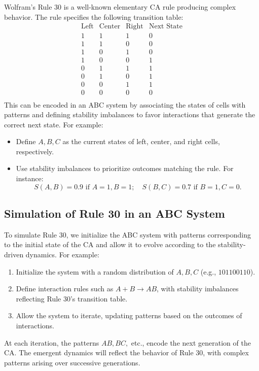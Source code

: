 \documentclass[entropy,article,submit,pdftex,moreauthors]{Definitions/mdpi}
\begin{document}
Wolfram’s Rule 30 is a well-known elementary CA rule producing complex behavior. The rule specifies the following transition table:
\[
\begin{array}{ccc|c}
\text{Left} & \text{Center} & \text{Right} & \text{Next State} \\
1 & 1 & 1 & 0 \\
1 & 1 & 0 & 0 \\
1 & 0 & 1 & 0 \\
1 & 0 & 0 & 1 \\
0 & 1 & 1 & 1 \\
0 & 1 & 0 & 1 \\
0 & 0 & 1 & 1 \\
0 & 0 & 0 & 0 \\
\end{array}
\]
This can be encoded in an ABC system by associating the states of cells with patterns and defining stability imbalances to favor interactions that generate the correct next state. For example:
\begin{itemize}
    \item Define \( A, B, C \) as the current states of left, center, and right cells, respectively.
    \item Use stability imbalances to prioritize outcomes matching the rule. For instance:
    \[
    S(A, B) = 0.9 \text{ if } A = 1, B = 1; \quad S(B, C) = 0.7 \text{ if } B = 1, C = 0.
    \]
\end{itemize}

\subsection{Simulation of Rule 30 in an ABC System}

To simulate Rule 30, we initialize the ABC system with patterns corresponding to the initial state of the CA and allow it to evolve according to the stability-driven dynamics. For example:
\begin{enumerate}
    \item Initialize the system with a random distribution of \( A, B, C \) (e.g., \( 101100110 \)).
    \item Define interaction rules such as \( A + B \to AB \), with stability imbalances reflecting Rule 30’s transition table.
    \item Allow the system to iterate, updating patterns based on the outcomes of interactions.
\end{enumerate}

At each iteration, the patterns \( AB, BC, \) etc., encode the next generation of the CA. The emergent dynamics will reflect the behavior of Rule 30, with complex patterns arising over successive generations.
\end{document}
